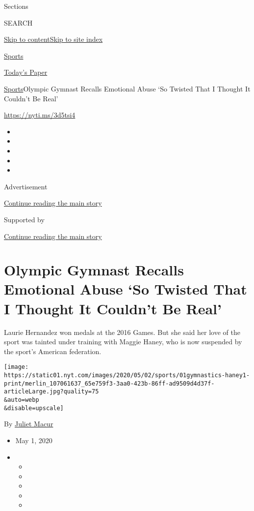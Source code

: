 Sections

SEARCH

\protect\hyperlink{site-content}{Skip to
content}\protect\hyperlink{site-index}{Skip to site index}

\href{https://www.nytimes.com/section/sports}{Sports}

\href{https://myaccount.nytimes.com/auth/login?response_type=cookie\&client_id=vi}{}

\href{https://www.nytimes.com/section/todayspaper}{Today's Paper}

\href{/section/sports}{Sports}\textbar{}Olympic Gymnast Recalls
Emotional Abuse `So Twisted That I Thought It Couldn't Be Real'

\url{https://nyti.ms/3d5tsi4}

\begin{itemize}
\item
\item
\item
\item
\item
\end{itemize}

Advertisement

\protect\hyperlink{after-top}{Continue reading the main story}

Supported by

\protect\hyperlink{after-sponsor}{Continue reading the main story}

\hypertarget{olympic-gymnast-recalls-emotional-abuse-so-twisted-that-i-thought-it-couldnt-be-real}{%
\section{Olympic Gymnast Recalls Emotional Abuse `So Twisted That I
Thought It Couldn't Be
Real'}\label{olympic-gymnast-recalls-emotional-abuse-so-twisted-that-i-thought-it-couldnt-be-real}}

Laurie Hernandez won medals at the 2016 Games. But she said her love of
the sport was tainted under training with Maggie Haney, who is now
suspended by the sport's American federation.

\texttt{[image: https://static01.nyt.com/images/2020/05/02/sports/01gymnastics-haney1-print/merlin\_107061637\_65e759f3-3aa0-423b-86ff-ad9509d4d37f-articleLarge.jpg?quality=75\\\&auto=webp\\\&disable=upscale]}

By \href{https://www.nytimes.com/by/juliet-macur}{Juliet Macur}

\begin{itemize}
\item
  May 1, 2020
\item
  \begin{itemize}
  \item
  \item
  \item
  \item
  \item
  \end{itemize}
\end{itemize}

